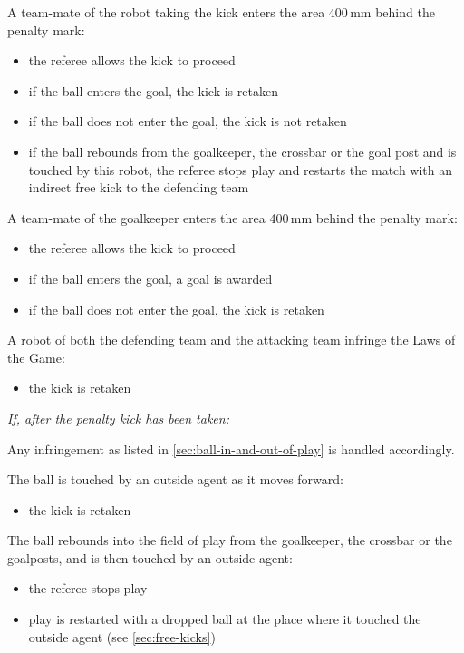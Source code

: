 A team-mate of the robot taking the kick enters the area 400\,mm behind the penalty mark:

\begin{itemize}
\item the referee allows the kick to proceed
\item if the ball enters the goal, the kick is retaken
\item if the ball does not enter the goal, the kick is not retaken
\item if the ball rebounds from the goalkeeper, the crossbar or the goal post and is touched by this robot, the referee stops play and restarts the match with an indirect free kick to the defending team
\end{itemize}

A team-mate of the goalkeeper enters the area 400\,mm behind the penalty mark:

\begin{itemize}
\item the referee allows the kick to proceed
\item if the ball enters the goal, a goal is awarded
\item if the ball does not enter the goal, the kick is retaken
\end{itemize}

A robot of both the defending team and the attacking team infringe the Laws of the Game:

\begin{itemize}
\item the kick is retaken
\end{itemize}

\textit{If, after the penalty kick has been taken:}

Any infringement as listed in \autoref{sec:ball-in-and-out-of-play} is handled accordingly.

The ball is touched by an outside agent as it moves forward:

\begin{itemize}
\item the kick is retaken
\end{itemize}

The ball rebounds into the field of play from the goalkeeper, the crossbar or the goalposts, and is then touched by an outside agent:

\begin{itemize}
\item the referee stops play
\item play is restarted with a dropped ball at the place where it touched the outside agent (see \autoref{sec:free-kicks})
\end{itemize}
